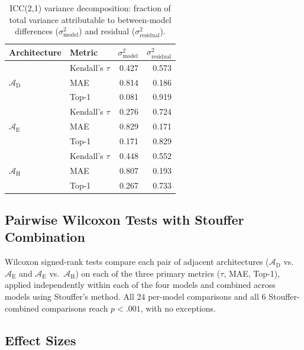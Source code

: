 \documentclass[final,3p,times]{elsarticle}
\begin{document}
\begin{table}[t]
\begin{threeparttable}
\small
\centering
\renewcommand{\arraystretch}{1.10}
\caption{ICC(2,1) variance decomposition: fraction of total variance attributable to between-model differences ($\sigma^2_{\text{model}}$) and residual ($\sigma^2_{\text{residual}}$).}
\label{tab:icc}
\begin{tabular}{@{}ll rr@{}}
\toprule
Architecture & Metric & $\sigma^2_{\text{model}}$ & $\sigma^2_{\text{residual}}$ \\
\midrule
\multirow{3}{*}{$\mathcal{A}_{\text{D}}$}
 & Kendall's $\tau$ & 0.427 & 0.573 \\
 & MAE & 0.814 & 0.186 \\
 & Top-1 & 0.081 & 0.919 \\
\midrule
\multirow{3}{*}{$\mathcal{A}_{\text{E}}$}
 & Kendall's $\tau$ & 0.276 & 0.724 \\
 & MAE & 0.829 & 0.171 \\
 & Top-1 & 0.171 & 0.829 \\
\midrule
\multirow{3}{*}{$\mathcal{A}_{\text{H}}$}
 & Kendall's $\tau$ & 0.448 & 0.552 \\
 & MAE & 0.807 & 0.193 \\
 & Top-1 & 0.267 & 0.733 \\
\bottomrule
\end{tabular}
\renewcommand{\arraystretch}{1.0}
\end{threeparttable}
\end{table}

\subsection{Pairwise Wilcoxon Tests with Stouffer Combination}

Wilcoxon signed-rank tests compare each pair of adjacent architectures ($\mathcal{A}_{\text{D}}$ vs.\ $\mathcal{A}_{\text{E}}$ and $\mathcal{A}_{\text{E}}$ vs.\ $\mathcal{A}_{\text{H}}$) on each of the three primary metrics ($\tau$, MAE, Top-1), applied independently within each of the four models and combined across models using Stouffer's method. All 24 per-model comparisons and all 6 Stouffer-combined comparisons reach $p < .001$, with no exceptions.

\subsection{Effect Sizes}
\end{document}
